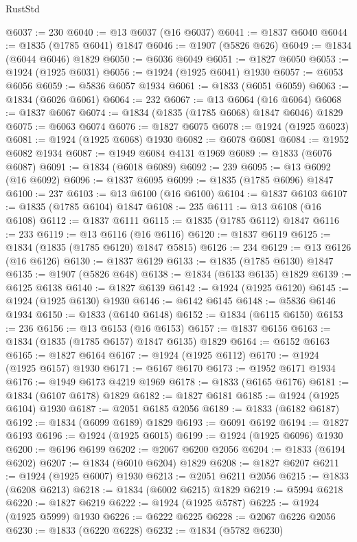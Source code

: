 \begin{lexlean}{RustStd}
\begin{coremodule}
@6037 := 230
@6040 := @13 @6037 (@16 @6037)
@6041 := @1837 @6040
@6044 := @1835 (@1785 @6041) @1847
@6046 := @1907 (@5826 @626)
@6049 := @1834 (@6044 @6046) @1829
@6050 := @6036 @6049
@6051 := @1827 @6050
@6053 := @1924 (@1925 @6031)
@6056 := @1924 (@1925 @6041) @1930
@6057 := @6053 @6056
@6059 := @5836 @6057 @1934
@6061 := @1833 (@6051 @6059)
@6063 := @1834 (@6026 @6061)
@6064 := 232
@6067 := @13 @6064 (@16 @6064)
@6068 := @1837 @6067
@6074 := @1834 (@1835 (@1785 @6068) @1847 @6046) @1829
@6075 := @6063 @6074
@6076 := @1827 @6075
@6078 := @1924 (@1925 @6023)
@6081 := @1924 (@1925 @6068) @1930
@6082 := @6078 @6081
@6084 := @1952 @6082 @1934
@6087 := @1949 @6084 @4131 @1969
@6089 := @1833 (@6076 @6087)
@6091 := @1834 (@6018 @6089)
@6092 := 239
@6095 := @13 @6092 (@16 @6092)
@6096 := @1837 @6095
@6099 := @1835 (@1785 @6096) @1847
@6100 := 237
@6103 := @13 @6100 (@16 @6100)
@6104 := @1837 @6103
@6107 := @1835 (@1785 @6104) @1847
@6108 := 235
@6111 := @13 @6108 (@16 @6108)
@6112 := @1837 @6111
@6115 := @1835 (@1785 @6112) @1847
@6116 := 233
@6119 := @13 @6116 (@16 @6116)
@6120 := @1837 @6119
@6125 := @1834 (@1835 (@1785 @6120) @1847 @5815)
@6126 := 234
@6129 := @13 @6126 (@16 @6126)
@6130 := @1837 @6129
@6133 := @1835 (@1785 @6130) @1847
@6135 := @1907 (@5826 @648)
@6138 := @1834 (@6133 @6135) @1829
@6139 := @6125 @6138
@6140 := @1827 @6139
@6142 := @1924 (@1925 @6120)
@6145 := @1924 (@1925 @6130) @1930
@6146 := @6142 @6145
@6148 := @5836 @6146 @1934
@6150 := @1833 (@6140 @6148)
@6152 := @1834 (@6115 @6150)
@6153 := 236
@6156 := @13 @6153 (@16 @6153)
@6157 := @1837 @6156
@6163 := @1834 (@1835 (@1785 @6157) @1847 @6135) @1829
@6164 := @6152 @6163
@6165 := @1827 @6164
@6167 := @1924 (@1925 @6112)
@6170 := @1924 (@1925 @6157) @1930
@6171 := @6167 @6170
@6173 := @1952 @6171 @1934
@6176 := @1949 @6173 @4219 @1969
@6178 := @1833 (@6165 @6176)
@6181 := @1834 (@6107 @6178) @1829
@6182 := @1827 @6181
@6185 := @1924 (@1925 @6104) @1930
@6187 := @2051 @6185 @2056
@6189 := @1833 (@6182 @6187)
@6192 := @1834 (@6099 @6189) @1829
@6193 := @6091 @6192
@6194 := @1827 @6193
@6196 := @1924 (@1925 @6015)
@6199 := @1924 (@1925 @6096) @1930
@6200 := @6196 @6199
@6202 := @2067 @6200 @2056
@6204 := @1833 (@6194 @6202)
@6207 := @1834 (@6010 @6204) @1829
@6208 := @1827 @6207
@6211 := @1924 (@1925 @6007) @1930
@6213 := @2051 @6211 @2056
@6215 := @1833 (@6208 @6213)
@6218 := @1834 (@6002 @6215) @1829
@6219 := @5994 @6218
@6220 := @1827 @6219
@6222 := @1924 (@1925 @5787)
@6225 := @1924 (@1925 @5999) @1930
@6226 := @6222 @6225
@6228 := @2067 @6226 @2056
@6230 := @1833 (@6220 @6228)
@6232 := @1834 (@5782 @6230)

\end{coremodule}
\end{lexlean}
